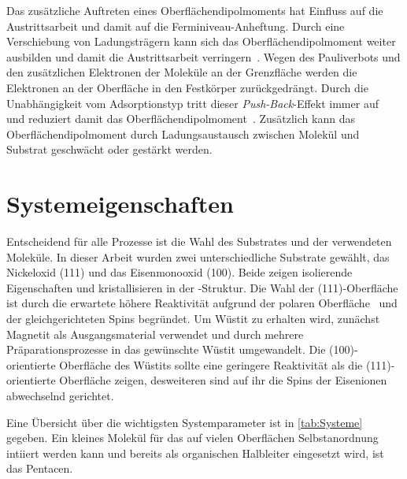             Das zusätzliche Auftreten eines Oberflächendipolmoments hat Einfluss auf die Austrittsarbeit und damit auf die Ferminiveau-Anheftung.
            Durch eine Verschiebung von Ladungsträgern kann sich das Oberflächendipolmoment weiter ausbilden und damit die Austrittsarbeit verringern~\cite{5A_5}.
            Wegen des Pauliverbots und den zusätzlichen Elektronen der Moleküle an der Grenzfläche werden die Elektronen an der Oberfläche in den Festkörper zurückgedrängt.
            Durch die Unabhängigkeit vom Adsorptionstyp tritt dieser \textit{Push-Back}-Effekt immer auf~\cite{IF_4} und reduziert damit das Oberflächendipolmoment~\cite{IF_1}.
            Zusätzlich kann das Oberflächendipolmoment durch Ladungsaustausch zwischen Molekül und Substrat geschwächt oder gestärkt werden.


    \section{Systemeigenschaften} \label{sec:Systeme}
        Entscheidend für alle Prozesse ist die Wahl des Substrates und der verwendeten Moleküle.
        In dieser Arbeit wurden zwei unterschiedliche Substrate gewählt, das Nickeloxid (111) und das Eisenmonooxid (100).
        Beide zeigen isolierende Eigenschaften und kristallisieren in der -Struktur.
        Die Wahl der (111)-Oberfläche ist durch die erwartete höhere Reaktivität aufgrund der polaren Oberfläche~\cite{cappus_hydroxyl_1993} und der gleichgerichteten Spins begründet.
        Um Wüstit zu erhalten wird, zunächst Magnetit als Ausgangsmaterial verwendet und durch mehrere Präparationsprozesse in das gewünschte Wüstit umgewandelt.
        Die (100)-orientierte Oberfläche des Wüstits sollte eine geringere Reaktivität als die (111)-orientierte Oberfläche zeigen, desweiteren sind auf ihr die Spins der Eisenionen abwechselnd gerichtet. %
        
        Eine Übersicht über die wichtigsten Systemparameter ist in \autoref{tab:Systeme} gegeben.
        Ein kleines Molekül für das auf vielen Oberflächen Selbstanordnung intiiert werden kann und bereits als organischen Halbleiter eingesetzt wird, ist das Pentacen.

